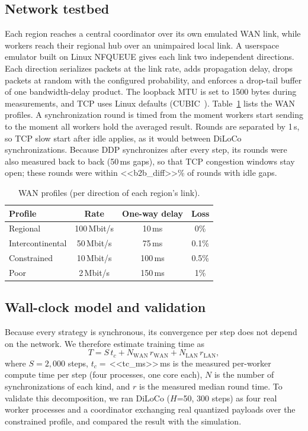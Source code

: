 \documentclass[conference]{IEEEtran}
\begin{document}
\subsection{Network testbed}
Each region reaches a central coordinator over its own emulated WAN link, while workers reach their regional hub over an unimpaired local link. A userspace emulator built on Linux NFQUEUE gives each link two independent directions. Each direction serializes packets at the link rate, adds propagation delay, drops packets at random with the configured probability, and enforces a drop-tail buffer of one bandwidth-delay product. The loopback MTU is set to 1500 bytes during measurements, and TCP uses Linux defaults (CUBIC~\cite{cubic}). Table~\ref{tab:profiles} lists the WAN profiles. A synchronization round is timed from the moment workers start sending to the moment all workers hold the averaged result. Rounds are separated by 1\,s, so TCP slow start after idle applies, as it would between DiLoCo synchronizations. Because DDP synchronizes after every step, its rounds were also measured back to back (50\,ms gaps), so that TCP congestion windows stay open; these rounds were within <<b2b_diff>>\% of rounds with idle gaps.

\begin{table}[t]
\caption{WAN profiles (per direction of each region's link).}
\label{tab:profiles}
\centering\footnotesize
\begin{tabular}{@{}lccc@{}}
\toprule
Profile & Rate & One-way delay & Loss \\
\midrule
Regional & 100\,Mbit/s & 10\,ms & 0\% \\
Intercontinental & 50\,Mbit/s & 75\,ms & 0.1\% \\
Constrained & 10\,Mbit/s & 100\,ms & 0.5\% \\
Poor & 2\,Mbit/s & 150\,ms & 1\% \\
\bottomrule
\end{tabular}
\end{table}

\subsection{Wall-clock model and validation}
Because every strategy is synchronous, its convergence per step does not depend on the network. We therefore estimate training time as
\begin{equation}
T = S\,t_c + N_{\mathrm{WAN}}\,r_{\mathrm{WAN}} + N_{\mathrm{LAN}}\,r_{\mathrm{LAN}},
\end{equation}
where $S=2{,}000$ steps, $t_c=$\,<<tc_ms>>\,ms is the measured per-worker compute time per step (four processes, one core each), $N$ is the number of synchronizations of each kind, and $r$ is the measured median round time. To validate this decomposition, we ran DiLoCo ($H$=50, 300 steps) as four real worker processes and a coordinator exchanging real quantized payloads over the constrained profile, and compared the result with the simulation.
\end{document}

